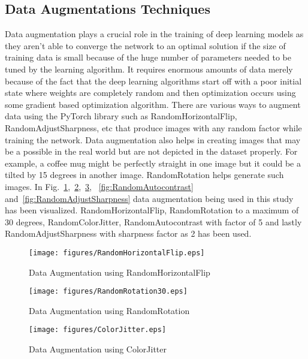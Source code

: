 \documentclass[conference]{IEEEtran}
\begin{document}
\subsection{Data Augmentations Techniques}
Data augmentation plays a crucial role in the training of deep 
learning models as they aren't able to converge the network to an optimal 
solution if the size of training data is small because of the huge number of parameters 
needed to be tuned by the learning algorithm. 
It requires enormous amounts of data merely because of the fact that the deep learning 
algorithms start off with a poor initial state where weights are completely random 
and then optimization occurs using some gradient based optimization algorithm. 
There are various ways to augment data using the PyTorch library such as 
RandomHorizontalFlip, RandomAdjustSharpness, etc that produce images with any 
random factor while training the network. Data augmentation also helps in creating images
 that may be a possible in the real world but are not depicted in the dataset properly.
 For example, a coffee mug might be perfectly straight in one image but it could be 
 a tilted by 15 degrees in another image. RandomRotation helps generate such images.
 In Fig.~\ref{fig:RandomHorizontalFlip},~\ref{fig:RandomRotation30},~\ref{fig:ColorJitter},
 ~\ref{fig:RandomAutocontrast} and~\ref{fig:RandomAdjustSharpness} 
 data augmentation being used in this study has been visualized.
 RandomHorizontalFlip, RandomRotation to a maximum of 30 degrees, RandomColorJitter, 
 RandomAutocontrast with factor of 5 and lastly RandomAdjustSharpness with sharpness factor as 2 
 has been used.

\begin{figure}[htbp] 
    \texttt{[image: figures/RandomHorizontalFlip.eps]} 
    \caption{Data Augmentation using RandomHorizontalFlip} 
    \label{fig:RandomHorizontalFlip} 
    \end{figure}

\begin{figure}[htbp] 
    \texttt{[image: figures/RandomRotation30.eps]} 
    \caption{Data Augmentation using RandomRotation} 
    \label{fig:RandomRotation30}
    \end{figure}

\begin{figure}[htbp] 
    \texttt{[image: figures/ColorJitter.eps]} 
    \caption{Data Augmentation using ColorJitter} 
    \label{fig:ColorJitter} 
    \end{figure}
\end{document}
